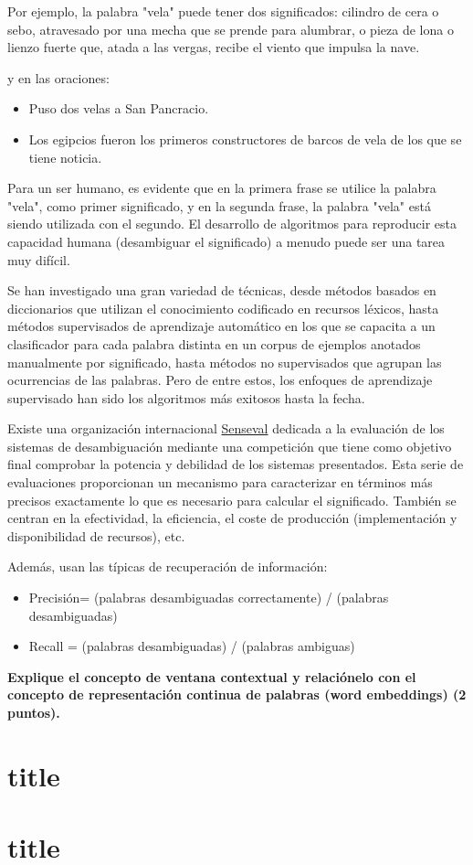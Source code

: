 \documentclass[11pt]{exam}
\begin{document}
\begin{questions}
Por ejemplo, la palabra "vela" puede tener dos significados: cilindro de cera o sebo, atravesado por una mecha que se prende para alumbrar, o pieza de lona o lienzo fuerte que, atada a las vergas, recibe el viento que impulsa la nave.

y en las oraciones:

\begin{itemize}
	\item Puso dos velas a San Pancracio.
	\item Los egipcios fueron los primeros constructores de barcos de vela de los que se tiene noticia.
\end{itemize}

Para un ser humano, es evidente que en la primera frase se utilice la palabra "vela", como primer significado, y en la segunda frase, la palabra "vela" está siendo utilizada con el segundo. El desarrollo de algoritmos para reproducir esta capacidad humana (desambiguar el significado) a menudo puede ser una tarea muy difícil.

Se han investigado una gran variedad de técnicas, desde métodos basados en diccionarios que utilizan el conocimiento codificado en recursos léxicos, hasta métodos supervisados de aprendizaje automático en los que se capacita a un clasificador para cada palabra distinta en un corpus de ejemplos anotados manualmente por significado, hasta métodos no supervisados que agrupan las ocurrencias de las palabras. Pero de entre estos, los enfoques de aprendizaje supervisado han sido los algoritmos más exitosos hasta la fecha.

Existe una organización internacional \href{http://www.senseval.org}{Senseval} dedicada a la evaluación de los sistemas de desambiguación mediante una competición que tiene como objetivo final comprobar la potencia y debilidad de los sistemas presentados. Esta serie de evaluaciones proporcionan un mecanismo para caracterizar en términos más precisos exactamente lo que es necesario para calcular el significado. También se centran en la efectividad, la eficiencia, el coste de producción (implementación y disponibilidad de recursos), etc. 

Además, usan las típicas de recuperación de información:

\begin{itemize}
	\item Precisión= (palabras desambiguadas correctamente) / (palabras desambiguadas)
	\item Recall = (palabras desambiguadas) / (palabras ambiguas)
\end{itemize}

{\bf \question Explique el concepto de ventana contextual y relaciónelo con el concepto de representación continua de palabras (word embeddings) (2 puntos).}

\section{title}

\section{title}
	
\end{questions}
	
\end{document}
